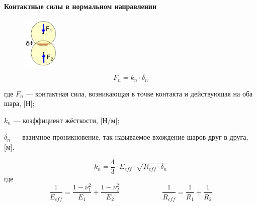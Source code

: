 \documentclass[c]{beamer}  %
\begin{document}
\begin{frame}
\frametitle{\insertsection} 
\framesubtitle{Контактные силы в нормальном направлении}

\begin{figure}
\includegraphics[width=0.15\textwidth]{vhod}
\end{figure}

\begin{equation}
\label{norm_force}
F_n = k_n \cdot \delta_n
\end{equation}

где $F_n$ --- контактная сила, возникающая в точке контакта и действующая на оба шара, [Н];

$k_n$ --- коэффициент жёсткости, [Н/м];

$\delta_n$ --- взаимное проникновение, так называемое вхождение шаров друг в друга, [м].

\begin{equation}
\label{kn_herz}
k_n = \frac{4}{3} \cdot E_{eff} \cdot \sqrt{R_{eff} \cdot \delta_n}
\end{equation}
где 
\[
\dfrac{1}{E_{eff}} = \dfrac{1 - \nu_1^2}{E_1} + \dfrac{1 - \nu_2^2}{E_2} \qquad \qquad \qquad \dfrac{1}{R_{eff}} = \dfrac{1}{R_1} + \dfrac{1}{R_2}
\]

\end{frame}
\end{document}
